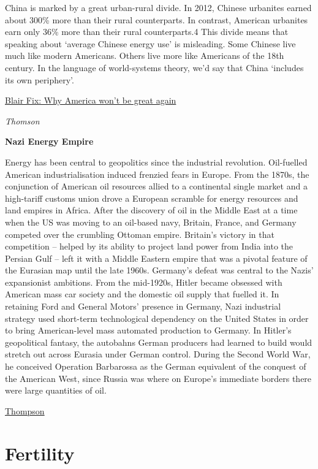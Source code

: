 \documentclass[
]{book}
\begin{document}
China is marked by a great urban-rural divide. In 2012, Chinese urbanites earned about 300\% more than their rural counterparts. In contrast, American urbanites earn only 36\% more than their rural counterparts.4 This divide means that speaking about `average Chinese energy use' is misleading. Some Chinese live much like modern Americans. Others live more like Americans of the 18th century. In the language of world-systems theory, we'd say that China `includes its own periphery'.

\href{https://economicsfromthetopdown.com/2020/07/11/why-america-wont-be-great-again/}{Blair Fix: Why America won't be great again}

\emph{Thomson}

\textbf{Nazi Energy Empire}

Energy has been central to geopolitics since the industrial revolution. Oil-fuelled American industrialisation induced frenzied fears in Europe. From the 1870s, the conjunction of American oil resources allied to a continental single market and a high-tariff customs union drove a European scramble for energy resources and land empires in Africa. After the discovery of oil in the Middle East at a time when the US was moving to an oil-based navy, Britain, France, and Germany competed over the crumbling Ottoman empire. Britain's victory in that competition -- helped by its ability to project land power from India into the Persian Gulf -- left it with a Middle Eastern empire that was a pivotal feature of the Eurasian map until the late 1960s. Germany's defeat was central to the Nazis' expansionist ambitions. From the mid-1920s, Hitler became obsessed with American mass car society and the domestic oil supply that fuelled it. In retaining Ford and General Motors' presence in Germany, Nazi industrial strategy used short-term technological dependency on the United States in order to bring American-level mass automated production to Germany. In Hitler's geopolitical fantasy, the autobahns German producers had learned to build would stretch out across Eurasia under German control. During the Second World War, he conceived Operation Barbarossa as the German equivalent of the conquest of the American West, since Russia was where on Europe's immediate borders there were large quantities of oil.

\href{https://engelsbergideas.com/essays/the-geopolitical-fight-to-come-over-green-energy/}{Thompson}

\hypertarget{fertility}{%
\chapter{Fertility}\label{fertility}}
\end{document}
